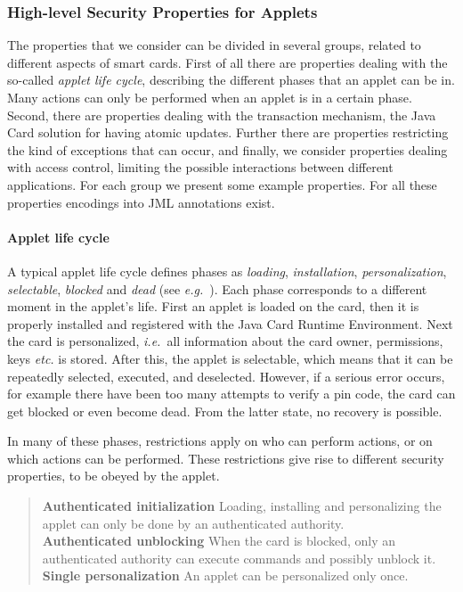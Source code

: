 \subsubsection{High-level Security Properties for Applets}
\label{SecHighLevelSecProp}

The properties that we consider can be divided in several groups,
related to different aspects of smart cards. First of all there are
properties dealing with the so-called \emph{applet life cycle},
describing the different phases that an applet can be in. Many actions
can only be performed when an applet is in a certain phase. Second,
there are properties dealing with the transaction mechanism, the Java
Card solution for having atomic updates. Further there are properties
restricting the kind of exceptions that can occur, and finally, we
consider properties dealing with access control, limiting the possible
interactions between different applications. For each group we present
some example properties. For all these properties encodings into JML
annotations exist.

\paragraph {Applet life cycle}

A typical applet life cycle defines phases as {\it loading},
{\it installation}, {\it personalization}, {\it selectable},
{\it blocked} and {\it dead}
(see \emph{e.g.}~\/\cite{MarletLM01}).  Each phase corresponds to a
different moment in the applet's life. First an applet is loaded on
the card, then it is properly installed and registered with the Java
Card Runtime Environment. Next the card is personalized,
\emph{i.e.}~all information about the card owner, permissions, keys
\emph{etc.} is stored. After this, the applet is selectable, which means
that it can be repeatedly selected, executed, and deselected. However,
if a serious error occurs, for example there
have been too many attempts to verify a pin code, the card can get
blocked or even become dead. From the latter state, no recovery is
possible.

In many of these phases, restrictions apply on who can perform
actions, or on which actions can be performed. These restrictions give
rise to different security properties, to be obeyed by the applet.

\begin{quote}
\textbf{Authenticated initialization} Loading, installing and 
personalizing the applet can only be done by an authenticated
authority.\smallskip\\
\textbf{Authenticated unblocking} When the card is blocked,
only an authenticated authority can execute commands and possibly
unblock it.\smallskip\\
\textbf{Single personalization} An applet can be
personalized only once.
\end{quote}



